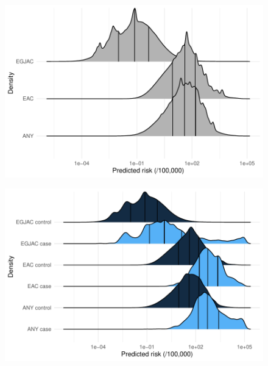 \documentclass[12pt]{article}
\begin{document}
\begin{figure}[h]
\centering
\includegraphics[width=1.0\textwidth]{figures/risk_distribution.pdf}
\end{figure}

\begin{figure}[h]
\centering
\includegraphics[width=1.0\textwidth]{figures/risk_distribution_casecontrol.pdf}
\end{figure}
\end{document}
